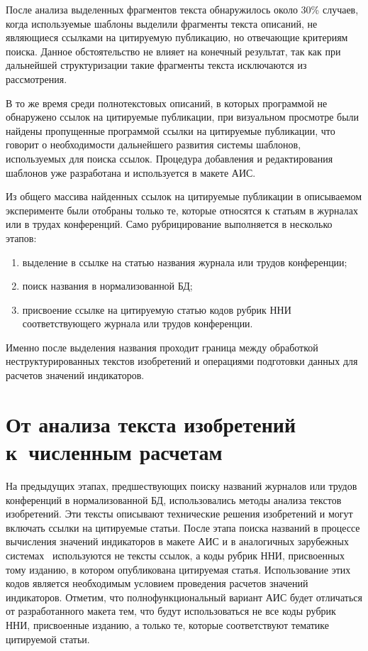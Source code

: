 \begin{multicols}{2}
     После анализа выделенных фрагментов текста обнаружилось около 30\% случаев, когда используемые шаблоны
выделили фрагменты текста описаний, не являющиеся ссылками на цитируемую публикацию, но отвечающие
критериям поиска. Данное обстоятельство не влияет на конечный результат, так как при дальнейшей структуризации
такие фрагменты текста исключаются из рас\-смот\-рения.

     В то же время среди полнотекстовых описаний, в которых программой не обнаружено ссылок на цитируемые
публикации, при визуальном просмотре были найдены пропущенные программой ссылки на цитируемые публикации,
что говорит о необходимости дальнейшего развития системы шаблонов, используемых для поиска ссылок. Процедура
добавления и редактирования шаблонов уже разработана и используется в макете АИС.

     Из общего массива найденных ссылок на цитируемые публикации в описываемом эксперименте были отобраны
только те, которые относятся к \mbox{статьям} в журналах или в трудах конференций. Само рубрицирование выполняется в
несколько этапов:
     \begin{enumerate}[(1)]
\item выделение в ссылке на статью названия журнала или трудов конференции;
\item поиск названия в нормализованной БД;
\item присвоение ссылке на цитируемую статью кодов рубрик ННИ соответствующего журнала или трудов
конференции.
     \end{enumerate}

     Именно после выделения названия проходит граница между обработкой неструктурированных текстов
изобретений и операциями подготовки данных для расчетов значений индикаторов.

\section{От анализа текста изобретений к~численным расчетам}

     На предыдущих этапах, предшествующих поиску названий журналов или трудов конференций в нормализованной
БД, использовались методы анализа текстов изобретений. Эти тексты описывают технические решения
изобретений и могут включать ссылки на цитируемые статьи. После этапа поиска названий в процессе вычисления
значений индикаторов в макете АИС и в аналогичных зарубежных системах~\cite{6-zat, 11-zat, 21-zat}
используются не тексты ссылок, а коды рубрик ННИ, присвоенных тому изданию, в котором опубликована цитируемая статья. Использование
этих кодов является необходимым условием проведения расчетов значений индикаторов. Отметим, что
полнофункциональный вариант АИС будет отличаться от разработанного макета тем, что будут использоваться не все
коды рубрик ННИ, присвоенные изданию, а только те, которые соответствуют тематике цитируемой статьи.


\end{multicols}
